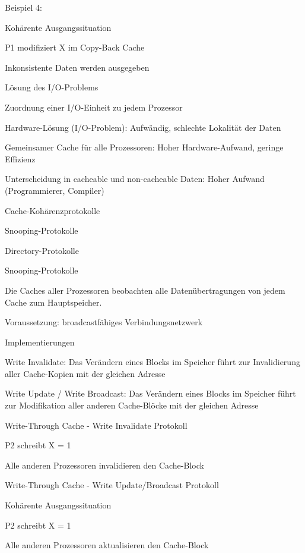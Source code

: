 \documentclass[10pt,landscape]{article}
\begin{document}
\begin{multicols}{3}
\begin{itemize*}
    \item Beispiel 4:
    \item Kohärente Ausgangssituation
    \item P1 modifiziert X im Copy-Back Cache
    \item Inkonsistente Daten werden ausgegeben
    \item Lösung des I/O-Problems
    \item Zuordnung einer I/O-Einheit zu jedem Prozessor
    \item Hardware-Lösung (I/O-Problem): Aufwändig, schlechte Lokalität der Daten
    \item Gemeinsamer Cache für alle Prozessoren: Hoher Hardware-Aufwand, geringe Effizienz
    \item Unterscheidung in cacheable und non-cacheable Daten: Hoher Aufwand (Programmierer, Compiler)
    \item Cache-Kohärenzprotokolle
    \item Snooping-Protokolle
    \item Directory-Protokolle
  \end{itemize*}
  
  Snooping-Protokolle
  \begin{itemize*}
    \item Die Caches aller Prozessoren beobachten alle Datenübertragungen von jedem Cache zum Hauptspeicher.
    \item Voraussetzung: broadcastfähiges Verbindungsnetzwerk
    \item Implementierungen
    \item Write Invalidate: Das Verändern eines Blocks im Speicher führt zur Invalidierung aller Cache-Kopien mit der gleichen Adresse
    \item Write Update / Write Broadcast: Das Verändern eines Blocks im Speicher führt zur Modifikation aller anderen Cache-Blöcke mit der gleichen Adresse
  \end{itemize*}
  
  Write-Through Cache - Write Invalidate Protokoll
  \begin{itemize*}
    \item P2 schreibt X = 1
    \item Alle anderen Prozessoren invalidieren den Cache-Block
  \end{itemize*}
  
  Write-Through Cache - Write Update/Broadcast Protokoll
  \begin{itemize*}
    \item Kohärente Ausgangssituation
    \item P2 schreibt X = 1
    \item Alle anderen Prozessoren aktualisieren den Cache-Block
  \end{itemize*}
  

\end{multicols}
\end{document}
